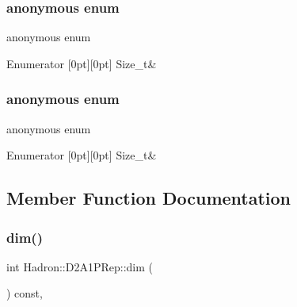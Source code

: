 \subsubsection{\texorpdfstring{anonymous enum}{anonymous enum}}
{\footnotesize\ttfamily anonymous enum}

\begin{DoxyEnumFields}{Enumerator}
[0pt][0pt]{}\mbox{\label{structHadron_1_1D2A1PRep_a2b854d6f23590f51db88e4866153c48babfaaee73d648de55bbbaa0cba987a266}} 
Size\+\_\+t&\\
\hline

\end{DoxyEnumFields}
\mbox{\label{structHadron_1_1D2A1PRep_a2b854d6f23590f51db88e4866153c48b}} 
\subsubsection{\texorpdfstring{anonymous enum}{anonymous enum}}
{\footnotesize\ttfamily anonymous enum}

\begin{DoxyEnumFields}{Enumerator}
[0pt][0pt]{}\mbox{\label{structHadron_1_1D2A1PRep_a2b854d6f23590f51db88e4866153c48babfaaee73d648de55bbbaa0cba987a266}} 
Size\+\_\+t&\\
\hline

\end{DoxyEnumFields}


\subsection{Member Function Documentation}
\mbox{\label{structHadron_1_1D2A1PRep_a662b1c07136e38264b71c20d97f232ce}} 
\subsubsection{\texorpdfstring{dim()}{dim()}\hspace{0.1cm}{\footnotesize\ttfamily [1/2]}}
{\footnotesize\ttfamily int Hadron\+::\+D2\+A1\+P\+Rep\+::dim (\begin{DoxyParamCaption}{ }\end{DoxyParamCaption}) const\hspace{0.3cm}{\ttfamily [inline]}, {\ttfamily [virtual]}}

